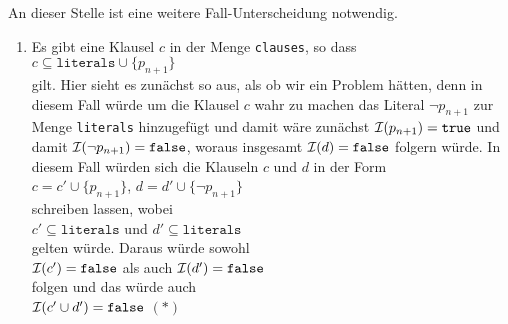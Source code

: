 \begin{enumerate}
\begin{enumerate}
                   An dieser Stelle ist eine weitere Fall-Unterscheidung notwendig.
                   \begin{enumerate}
                   \item Es gibt eine Klausel $c$ in der Menge \texttt{clauses}, so dass
                         \\[0.2cm]
                         \hspace*{1.3cm}
                         $c \subseteq \texttt{literals} \cup \{p_{n+1}\}$
                         \\[0.2cm]
                         gilt.  Hier sieht es zun\"{a}chst so aus, als ob wir ein Problem h\"{a}tten, denn
                         in diesem Fall w\"{u}rde um die Klausel $c$ wahr zu machen das Literal $\neg p_{n+1}$ zur Menge
                         \texttt{literals} hinzugef\"{u}gt und damit w\"{a}re zun\"{a}chst $\mathcal{I}(p_{n+1}) = \texttt{true}$ 
                         und damit $\mathcal{I}(\neg p_{n+1}) = \texttt{false}$, woraus insgesamt 
                         $\mathcal{I}(d) = \texttt{false}$ folgern w\"{u}rde.  In diesem Fall w\"{u}rden sich
                         die Klauseln $c$ und $d$  in der Form
                         \\[0.2cm]
                         \hspace*{1.3cm}
                         $c = c' \cup \{p_{n+1}\}$, \quad $d = d' \cup \{ \neg p_{n+1} \}$
                         \\[0.2cm]
                         schreiben lassen, wobei 
                         \\[0.2cm]
                         \hspace*{1.3cm}
                         $c' \subseteq \texttt{literals}$  \quad und \quad $d' \subseteq \texttt{literals}$
                         \\[0.2cm]
                         gelten w\"{u}rde.  Daraus w\"{u}rde sowohl
                         \\[0.2cm]
                         \hspace*{1.3cm}
                         $\mathcal{I}(c') = \texttt{false}$ \quad als auch \quad $\mathcal{I}(d') = \texttt{false}$
                         \\[0.2cm]
                         folgen und das w\"{u}rde auch
                         \\[0.2cm]
                         \hspace*{1.3cm}
                         $\mathcal{I}(c' \cup d') = \texttt{false}$ \hspace*{\fill} $(*)$

\end{enumerate}
\end{enumerate}
\end{enumerate}
